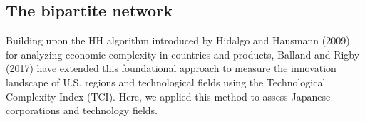 \documentclass[fleqn,10pt]{wlscirep}
\begin{document}




\subsection*{The bipartite network}
Building upon the HH algorithm introduced by Hidalgo and Hausmann (2009)\cite{hidalgo2009eci} for analyzing economic complexity in countries and products, %
Balland and Rigby (2017) have extended this foundational approach to measure the innovation landscape of U.S. regions and technological fields using the Technological Complexity Index (TCI). 
Here, we applied this method to assess Japanese corporations and technology fields. 
\end{document}
